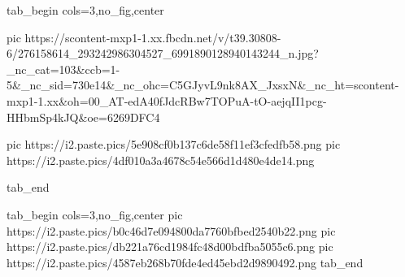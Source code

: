  
 
 
 
 


\ifcmt
  tab_begin cols=3,no_fig,center

     pic https://scontent-mxp1-1.xx.fbcdn.net/v/t39.30808-6/276158614_293242986304527_6991890128940143244_n.jpg?_nc_cat=103&ccb=1-5&_nc_sid=730e14&_nc_ohc=C5GJyvL9nk8AX_JxsxN&_nc_ht=scontent-mxp1-1.xx&oh=00_AT-edA40fJdcRBw7TOPuA-tO-aejqII1pcg-HHbmSp4kJQ&oe=6269DFC4

		 pic https://i2.paste.pics/5e908cf0b137c6de58f11ef3cfedfb58.png
		 pic https://i2.paste.pics/4df010a3a4678c54e566d1d480e4de14.png

  tab_end
\fi

\ifcmt
  tab_begin cols=3,no_fig,center
		 pic https://i2.paste.pics/b0c46d7e094800da7760bfbed2540b22.png
     pic https://i2.paste.pics/db221a76cd1984fc48d00bdfba5055c6.png
		 pic https://i2.paste.pics/4587eb268b70fde4ed45ebd2d9890492.png
  tab_end
\fi

